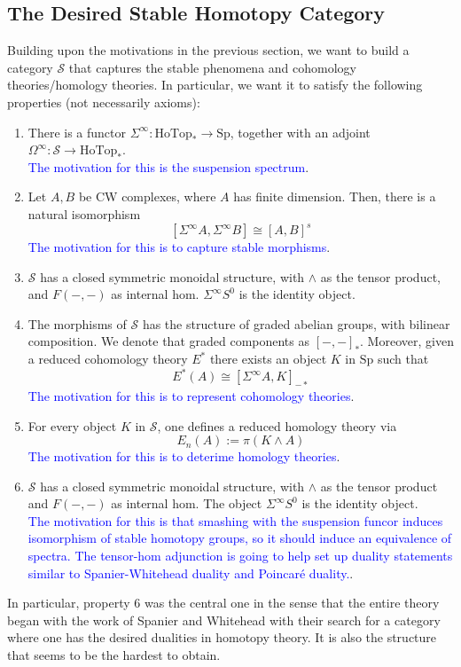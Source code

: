 \documentclass{article}
\theoremstyle{definition}
\theoremstyle{definition}
\theoremstyle{definition}
\theoremstyle{definition}
\theoremstyle{definition}
\theoremstyle{definition}
\theoremstyle{definition}
\begin{document}
\subsection{The Desired Stable Homotopy Category}
Building upon the motivations in the previous section, we want to build a category $\mathcal{S}$ that captures the stable phenomena and cohomology theories/homology theories. In particular, we want it to satisfy the following properties (not necessarily axioms):
\begin{enumerate}
    \item There is a functor $\Sigma^{\infty}: \textrm{HoTop}_*\to \textrm{Sp}$, together with an adjoint $\Omega^{\infty}: \mathcal{S}\to \textrm{HoTop}_*$. \\
    \textcolor{blue}{The motivation for this is the suspension spectrum}.
    \item Let $A,B$ be CW complexes, where $A$ has finite dimension. Then, there is a natural isomorphism
    \[[\Sigma^{\infty}A, \Sigma^{\infty}B]\cong [A,B]^s\]
    \textcolor{blue}{The motivation for this is to capture stable morphisms}.
    \item $\mathcal{S}$ has a closed symmetric monoidal structure, with $\wedge$ as the tensor product, and $F(-,-)$ as internal hom. $\Sigma^{\infty}S^0$ is the identity object.
    \item The morphisms of $\mathcal{S}$ has the structure of graded abelian groups, with bilinear composition. We denote that graded components as $[-,-]_*$. Moreover, given a reduced cohomology theory $E^*$ there exists an object $K$ in $\textrm{Sp}$ such that 
    \[E^*(A)\cong [\Sigma^{\infty}A, K]_{-*}\]
    \textcolor{blue}{The motivation for this is to represent cohomology theories}.\\
    \item For every object $K$ in $\mathcal{S}$, one defines a reduced homology theory via 
    \[E_n(A):=\pi(K\wedge A)\]
    \textcolor{blue}{The motivation for this is to deterime homology theories}.
    \\
    \item $\mathcal{S}$ has a closed symmetric monoidal structure, with $\wedge$ as the tensor product and $F(-,-)$ as internal hom. The object $\Sigma^{\infty}S^0$ is the identity object.\\
    \textcolor{blue}{The motivation for this is that smashing with the suspension funcor induces isomorphism of stable homotopy groups, so it should induce an equivalence of spectra. The tensor-hom adjunction is going to help set up duality statements similar to Spanier-Whitehead duality and Poincar\'e duality.}.
\end{enumerate}
In particular, property $6$ was the central one in the sense that the entire theory began with the work of Spanier and Whitehead with their search for a category where one has the desired dualities in homotopy theory. It is also the structure that seems to be the hardest to obtain.  
\end{document}
